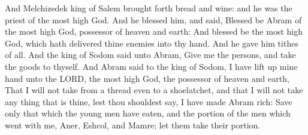 \begin{biblechapter}
\verse And Melchizedek king of Salem brought forth bread and wine: and he was the priest of the most high God.
\verse And he blessed him, and said, Blessed be Abram of the most high God, possessor of heaven and earth:
\verse And blessed be the most high God, which hath delivered thine enemies into thy hand. And he gave him tithes of all.
\verse And the king of Sodom said unto Abram, Give me the persons, and take the goods to thyself.
\verse And Abram said to the king of Sodom, I have lift up mine hand unto the LORD, the most high God, the possessor of heaven and earth,
\verse That I will not take from a thread even to a shoelatchet, and that I will not take any thing that is thine, lest thou shouldest say, I have made Abram rich:
\verse Save only that which the young men have eaten, and the portion of the men which went with me, Aner, Eshcol, and Mamre; let them take their portion.
\end{biblechapter}

